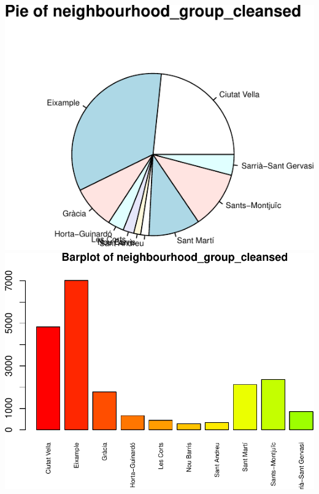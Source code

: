 \includegraphics{anal_files/figure-latex/unnamed-chunk-7-16.pdf}
\includegraphics{anal_files/figure-latex/unnamed-chunk-7-17.pdf}

